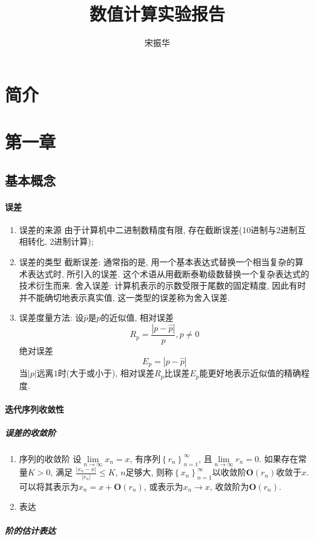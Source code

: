 \documentclass{ctexart}
\title{数值计算实验报告}
\author{宋振华}
\begin{document}
	\maketitle
	\clearpage
	\setcounter{section}{-1}
\section{简介}
\section{第一章}
\subsection{基本概念}
	\paragraph{误差}
		\begin{enumerate}
			\item 误差的来源
			由于计算机中二进制数精度有限, 存在截断误差(10进制与2进制互相转化, 2进制计算); 
			\item 误差的类型
				\subitem 截断误差: 通常指的是, 用一个基本表达式替换一个相当复杂的算术表达式时, 所引入的误差. 这个术语从用截断泰勒级数替换一个复杂表达式的技术衍生而来.
				\subitem 舍入误差: 计算机表示的示数受限于尾数的固定精度, 因此有时并不能确切地表示真实值, 这一类型的误差称为舍入误差.
			\item 误差度量方法: 
			设$\hat{p}$是$p$的近似值,
				\subitem 相对误差
				$$R_p = \frac{\left|p-\hat{p} \right|}{p}, p\neq 0$$
				\subitem 绝对误差
				$$E_p = \left|p - \hat{p}\right|$$
				\subitem 当$\left|p\right|$远离$1$时(大于或小于), 相对误差$R_p$比误差$E_p$能更好地表示近似值的精确程度.
		\end{enumerate}

	\paragraph{迭代序列收敛性}
		\subparagraph{误差的收敛阶}
			\begin{enumerate}
				\item 序列的收敛阶
				设$\lim\limits_{n\to \infty}x_n = x$, 有序列$\left\{r_n \right\}_{n=1}^{\infty}$, 且$\lim\limits_{n \to \infty}r_n = 0$. 如果存在常量$K>0$, 满足
				$\frac{\left|x_n - x\right|}{\left|r_n \right|} \leq K$, $n$足够大, 则称$\left\{ x_n\right\}_{n=1}^{\infty}$以收敛阶$\bm{O}\left(r_n\right)$收敛于$x$.
				可以将其表示为$x_n = x + \bm{O} \left(r_n\right)$, 或表示为$x_n \to x$, 收敛阶为$\bm{O}\left(r_n\right)$.
				\item 表达
			\end{enumerate}
		\subparagraph{阶的估计表达}
\end{document}
